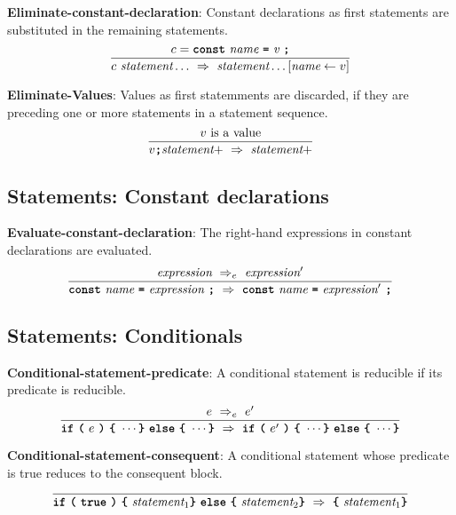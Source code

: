 \vspace{10mm}
\textbf{Eliminate-constant-declaration}: Constant declarations as first
statements are substituted in the remaining statements.
\[
\frac{
             c = \textbf{\texttt{const}}\  \textit{name} \ 
             \textbf{\texttt{=}}\  \textit{v} \ \textbf{\texttt{;}}
}{
c\ \textit{statement} \ldots\ 
  \Rightarrow \ 
  \textit{statement} \ldots[\textit{name} \leftarrow v]
}
\]

\vspace{10mm}
\textbf{Eliminate-Values}: Values as first statemments are discarded, if
they are preceding one or more statements in a statement sequence.
\[
\frac{
v \ \mbox{is a value}  
}{
v \textbf{\texttt{;}} \textit{statement}+\ 
   \Rightarrow  \ 
  \textit{statement}+
}
\]

\subsection*{Statements: Constant declarations}

\textbf{Evaluate-constant-declaration}: The right-hand expressions
in constant declarations are evaluated.
\[
\frac{
  \textit{expression}
  \ \Rightarrow_e \ 
  \textit{expression}'
}{
  \textbf{\texttt{const}}\  \textit{name} \ 
  \textbf{\texttt{=}}\  \textit{expression} \ \textbf{\texttt{;}}\ 
  \Rightarrow \ 
  \textbf{\texttt{const}}\  \textit{name} \ 
  \textbf{\texttt{=}}\  \textit{expression}' \ \textbf{\texttt{;}}
}
\]


\subsection*{Statements: Conditionals}

\textbf{Conditional-statement-predicate}: A conditional statement
is reducible if its predicate is reducible.
\[
\frac{
  e\ \Rightarrow_e\ e'
}{  
  \textbf{\texttt{if}}\ 
  \textbf{\texttt{(}}\ 
  e \ 
  \textbf{\texttt{)}} \ 
  \textbf{\texttt{\{}} \
  \cdots  
  \textbf{\texttt{\}}} \ 
  \textbf{\texttt{else}} \ 
  \textbf{\texttt{\{}} \
  \cdots  
  \textbf{\texttt{\}}}
\ 
  \Rightarrow \ 
  \textbf{\texttt{if}}\ 
  \textbf{\texttt{(}}\ 
  e' \ 
  \textbf{\texttt{)}} \ 
  \textbf{\texttt{\{}} \
  \cdots  
  \textbf{\texttt{\}}} \ 
  \textbf{\texttt{else}} \ 
  \textbf{\texttt{\{}} \
  \cdots  
  \textbf{\texttt{\}}}
}
\]

\vspace{10mm}

\textbf{Conditional-statement-consequent}: A conditional statement
whose predicate is true reduces to the consequent block.
\[
\frac{
}{  
  \textbf{\texttt{if}}\ 
  \textbf{\texttt{(}}\ 
  \textbf{\texttt{true}} \ 
  \textbf{\texttt{)}} \ 
  \textbf{\texttt{\{}} \
  \textit{statement}_1
  \textbf{\texttt{\}}} \ 
  \textbf{\texttt{else}} \ 
  \textbf{\texttt{\{}} \
\textit{statement}_2  
  \textbf{\texttt{\}}}
  \ 
  \Rightarrow  \ 
  \textbf{\texttt{\{}} \
  \textit{statement}_1  
  \textbf{\texttt{\}}}
}
\]

